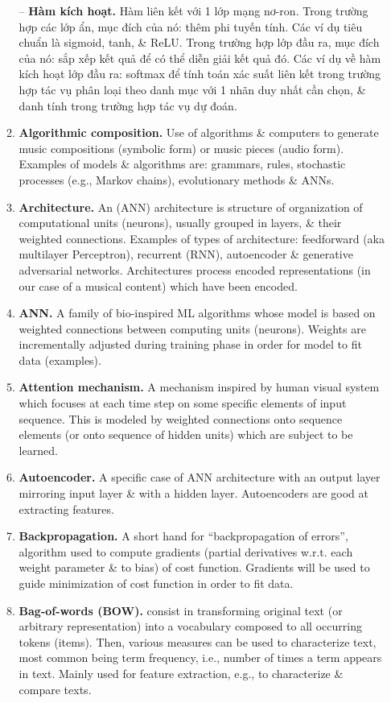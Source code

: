 \documentclass{article}
\begin{document}
\begin{itemize}
\begin{enumerate}
		-- {\bf Hàm kích hoạt.} Hàm liên kết với 1 lớp mạng nơ-ron. Trong trường hợp các lớp ẩn, mục đích của nó: thêm phi tuyến tính. Các ví dụ tiêu chuẩn là sigmoid, tanh, \& ReLU. Trong trường hợp lớp đầu ra, mục đích của nó: sắp xếp kết quả để có thể diễn giải kết quả đó. Các ví dụ về hàm kích hoạt lớp đầu ra: softmax để tính toán xác suất liên kết trong trường hợp tác vụ phân loại theo danh mục với 1 nhãn duy nhất cần chọn, \& danh tính trong trường hợp tác vụ dự đoán.
		\item {\bf Algorithmic composition.} Use of algorithms \& computers to generate music compositions (symbolic form) or music pieces (audio form). Examples of models \& algorithms are: grammars, rules, stochastic processes (e.g., Markov chains), evolutionary methods \& ANNs.
		\item {\bf Architecture.} An (ANN) architecture is structure of organization of computational units (neurons), usually grouped in layers, \& their weighted connections. Examples of types of architecture: feedforward (aka multilayer Perceptron), recurrent (RNN), autoencoder \& generative adversarial networks. Architectures process encoded representations (in our case of a musical content) which have been encoded.
		\item {\bf ANN.} A family of bio-inspired ML algorithms whose model is based on weighted connections between computing units (neurons). Weights are incrementally adjusted during training phase in order for model to fit data (examples).
		\item {\bf Attention mechanism.} A mechanism inspired by human visual system which focuses at each time step on some specific elements of input sequence. This is modeled by weighted connections onto sequence elements (or onto sequence of hidden units) which are subject to be learned.
		\item {\bf Autoencoder.} A specific case of ANN architecture with an output layer mirroring input layer \& with a hidden layer. Autoencoders are good at extracting features.
		\item {\bf Backpropagation.} A short hand for ``backpropagation of errors'', algorithm used to compute gradients (partial derivatives w.r.t. each weight parameter \& to bias) of cost function. Gradients will be used to guide minimization of cost function in order to fit data.
		\item {\bf Bag-of-words (BOW).} consist in transforming original text (or arbitrary representation) into a vocabulary composed to all occurring tokens (items). Then, various measures can be used to characterize text, most common being term frequency, i.e., number of times a term appears in text. Mainly used for feature extraction, e.g., to characterize \& compare texts.

\end{enumerate}
\end{itemize}
\end{document}
